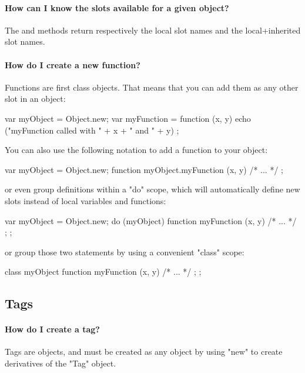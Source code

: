 \paragraph{How can I know the slots available for a given object?}
The  and  methods return
respectively the local slot names and the local+inherited slot names.

\paragraph{How do I create a new function?}
Functions are first class objects. That means that you can add them as
any other slot in an object:

\begin{urbifixme}
var myObject = Object.new;
var myFunction = function (x, y)
  { echo ("myFunction called with " + x + " and " + y) };
\end{urbifixme}

You can also use the following notation to add a function to your
object:

\begin{urbifixme}
var myObject = Object.new;
function myObject.myFunction (x, y) { /* ... */ };
\end{urbifixme}

or even group definitions within a "do" scope, which will automatically
define new slots instead of local variables and functions:

\begin{urbifixme}
var myObject = Object.new;
do (myObject) {
  function myFunction (x, y) { /* ... */ };
};
\end{urbifixme}

or group those two statements by using a convenient "class" scope:

\begin{urbifixme}
class myObject {
  function myFunction (x, y) { /* ... */ };
};
\end{urbifixme}

\subsection{Tags}

\paragraph{How do I create a tag?}


Tags are objects, and must be created as any object by using "new" to create
derivatives of the "Tag" object.

